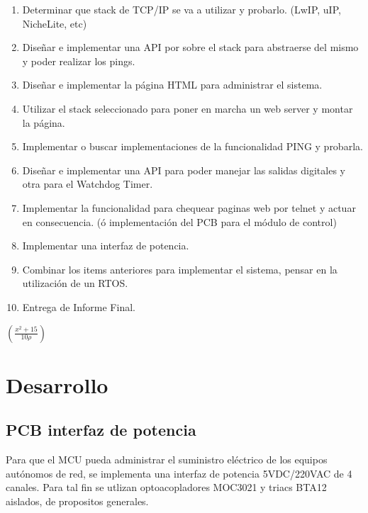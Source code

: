 \documentclass[a4paper,12pt]{article}
\begin{document}
\begin{enumerate}
\item Determinar que stack de TCP/IP se va a utilizar y probarlo. (LwIP, uIP, NicheLite, etc)
\item Diseñar e implementar una API por sobre el stack para abstraerse del mismo y poder realizar los pings.
\item Diseñar e implementar la página HTML para administrar el sistema.
\item Utilizar el stack seleccionado para poner en marcha un web server y montar la página.
\item Implementar o buscar implementaciones de la funcionalidad PING y probarla.
\item Diseñar e implementar una API para poder manejar las salidas digitales y otra para el Watchdog Timer.
\item Implementar la funcionalidad para chequear paginas web por telnet y actuar en consecuencia. (ó implementación del PCB para el módulo de control)
\item Implementar una interfaz de potencia. 
\item Combinar los items anteriores para implementar el sistema, pensar en la utilización de un RTOS.
\item Entrega de Informe Final.
\end{enumerate}

$\left({\frac{x^2+15}{10 \rho}}\right)$

\newpage
\section{Desarrollo}
\subsection{PCB interfaz de potencia}
Para que el MCU pueda administrar el suministro eléctrico de los equipos autónomos de red, se implementa una interfaz de potencia 5VDC/220VAC de 4 canales.  Para tal fin se utlizan optoacopladores MOC3021 y triacs BTA12 aislados, de propositos generales.\\
\end{document}
